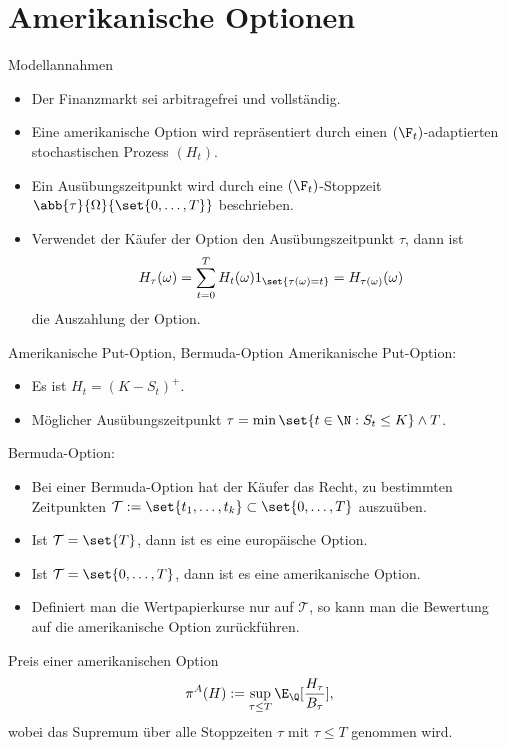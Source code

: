 \section{Amerikanische Optionen}

\begin{karte}{Modellannahmen}
\begin{itemize}
    \item Der Finanzmarkt sei arbitragefrei und vollständig. 
    \item Eine amerikanische Option wird repräsentiert durch einen \((\F_t)\)-adaptierten 
    stochastischen Prozess \((H_t)\).
    \item Ein Ausübungszeitpunkt wird durch eine \((\F_t)\)-Stoppzeit 
    \(\abb{\tau}{\Omega}{\set{0,\ldots, T}}\) beschrieben. 
    \item Verwendet der Käufer der Option den Ausübungszeitpunkt \(\tau\), dann ist 
    \[ H_\tau(\omega) = \sum_{t=0}^T H_t(\omega) 1_{\set{\tau(\omega) = t}} = H_{\tau(\omega)}(\omega) \]
    die Auszahlung der Option.
\end{itemize}
\end{karte}

\begin{karte}{Amerikanische Put-Option, Bermuda-Option}
Amerikanische Put-Option:
\begin{itemize}
    \item Es ist \(H_t = (K - S_t)^+\). 
    \item Möglicher Ausübungszeitpunkt \(\tau = \min \set{t \in \N: S_t \leq K} \wedge T\).
\end{itemize}

Bermuda-Option:
\begin{itemize}
    \item Bei einer Bermuda-Option hat der Käufer das Recht, zu bestimmten Zeitpunkten 
    \(\mathcal{T} := \set{t_1, \ldots, t_k} \subset \set{0, \ldots, T}\) auszuüben.
    \item Ist \(\mathcal{T} = \set{T}\), dann ist es eine europäische Option. 
    \item Ist \(\mathcal{T} = \set{0,\ldots, T}\), dann ist es eine amerikanische Option. 
    \item Definiert man die Wertpapierkurse nur auf \(\mathcal{T}\), so kann man die Bewertung auf 
    die amerikanische Option zurückführen.
\end{itemize}
\end{karte}

\begin{karte}{Preis einer amerikanischen Option}
\[ \pi^A(H) := \sup_{\tau \leq T} \E_\Q[\frac{H_\tau}{B_\tau}],\]
wobei das Supremum über alle Stoppzeiten \(\tau\) mit \(\tau \leq T\) genommen wird.
\end{karte}


